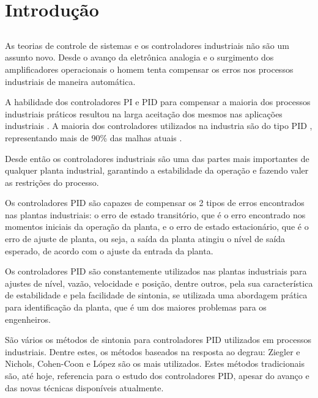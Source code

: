 \chapter{Introdução\label{cap:introducao}}

\section*{}

    As teorias de controle de sistemas e os controladores industriais não são um assunto
    novo. Desde o avanço da eletrônica analogia e o surgimento dos amplificadores
    operacionais o homem tenta compensar os erros nos processos industriais de maneira
    automática.

    A habilidade dos controladores \ac{PI} e \ac{PID} para compensar a maioria dos processos
    industriais práticos resultou na larga aceitação dos mesmos nas aplicações industriais
    \cite{Dwyer}. A maioria dos controladores utilizados na industria são do tipo
    \acs{PID} \cite{astrom1984645}, representando mais de 90\% das malhas atuais \cite{astrom20011163}. 

    Desde então os controladores industriais são uma das partes mais importantes de qualquer
    planta industrial, garantindo a estabilidade da operação e fazendo valer as restrições
    do processo.

    Os controladores \acs{PID} são capazes de compensar os 2 tipos de erros encontrados
    nas plantas industriais: o erro de estado transitório, que é o erro encontrado nos momentos
    iniciais da operação da planta, e o erro de estado estacionário, que é o erro de
    ajuste de planta, ou seja, a saída da planta atingiu o nível de saída esperado, de
    acordo com o ajuste da entrada da planta.

    Os controladores \acs{PID} são constantemente utilizados nas plantas industriais para
    ajustes de nível, vazão, velocidade e posição, dentre outros, pela sua característica
    de estabilidade e pela facilidade de sintonia, se utilizada uma abordagem prática
    para identificação da planta, que é um dos maiores problemas para os engenheiros.

    São vários os métodos de sintonia para controladores \acs{PID} utilizados em processos
    industriais. Dentre estes, os métodos baseados na resposta ao degrau: Ziegler e Nichols,
    Cohen-Coon e López são os mais utilizados. Estes métodos tradicionais são, até hoje,
    referencia para o estudo dos controladores \ac{PID}, apesar do avanço e das novas
    técnicas disponíveis atualmente.

